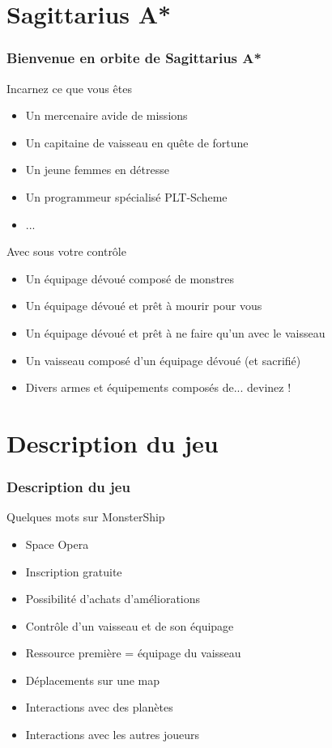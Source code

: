\documentclass{beamer}
\begin{document}
	\section{Sagittarius A*}
		\begin{frame}
			\frametitle{Bienvenue en orbite de Sagittarius A*}
			\begin{block}{Incarnez ce que vous êtes}
				\begin{itemize}
					\item Un mercenaire avide de missions
					\item Un capitaine de vaisseau en quête de fortune
					\item Un jeune femmes en détresse
					\item Un programmeur spécialisé PLT-Scheme
					\item ...
				\end{itemize}
			\end{block}
			
			\begin{block}{Avec sous votre contrôle}
				\begin{itemize}
					\item Un équipage dévoué composé de monstres
					\item Un équipage dévoué et prêt à mourir pour vous
					\item Un équipage dévoué et prêt à ne faire qu'un avec le vaisseau
					\item Un vaisseau composé d'un équipage dévoué (et sacrifié)
					\item Divers armes et équipements composés de... devinez !
				\end{itemize}
			\end{block}
		\end{frame}
		
	\section{Description du jeu}
		\begin{frame}
			\frametitle{Description du jeu}
			\begin{block}{Quelques mots sur MonsterShip}
				\begin{itemize}
					\item Space Opera
					\item Inscription gratuite
					\item Possibilité d'achats d'améliorations
					\item Contrôle d'un vaisseau et de son équipage
					\item Ressource première = équipage du vaisseau
					\item Déplacements sur une map
					\item Interactions avec des planètes
					\item Interactions avec les autres joueurs
				\end{itemize}
			\end{block}
		\end{frame}
\end{document}
